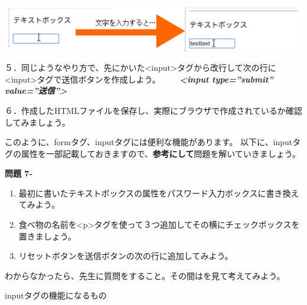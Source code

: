 \documentclass[a4paper,12pt,dvipdfmx]{jarticle}
\newcounter{Question}
\renewcommand\theQuestion{\textbf{問題 7-\arabic{Question}}}
\begin{document}
\centering
\includegraphics[width=16.3cm]{ome7-img037.png}
\flushleft

５．同じようなやり方で、先にかいた{\textless}input{\textgreater}タグから改行して次の行に{\textless}input{\textgreater}タグで送信ボタンを作成しよう。\newline
\ \ \ \ \textbf{\textit{{\textless}input type=”submit” value=”送信”{\textgreater}}}

６．作成したHTMLファイルを保存し、実際にブラウザで作成されているか確認してみましょう。\newline


このように、formタグ、inputタグには便利な機能があります。\newline
以下に、inputタグの属性を一部記載しておきますので、\textbf{参考にして}問題を解いていきましょう。


\bigskip

\clearpage
{}\theQuestion\label{Q:HTML}\newline
\begin{enumerate}
	\item 最初に書いたテキストボックスの属性をパスワード入力ボックスに書き換えてみよう。
	\item 食べ物の名前を{\textless}p{\textgreater}タグを使って３つ追加してその横にチェックボックスを置きましょう。
	\item リセットボタンを送信ボタンの次の行に追加してみよう。
\end{enumerate}

\samepage

わからなかったら、先生に質問をすること。その間はを見て考えてみよう。

inputタグの機能になるもの
\end{document}
